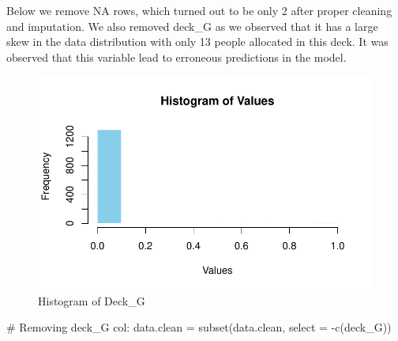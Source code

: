 \documentclass[
  letterpaper,
  DIV=11,
  numbers=noendperiod]{scrartcl}
\newenvironment{Shaded}{\begin{snugshade}}{\end{snugshade}}
\newcommand{\AttributeTok}[1]{\textcolor[rgb]{0.40,0.45,0.13}{#1}}
\newcommand{\CommentTok}[1]{\textcolor[rgb]{0.37,0.37,0.37}{#1}}
\newcommand{\FunctionTok}[1]{\textcolor[rgb]{0.28,0.35,0.67}{#1}}
\newcommand{\NormalTok}[1]{\textcolor[rgb]{0.00,0.23,0.31}{#1}}
\newcommand{\OtherTok}[1]{\textcolor[rgb]{0.00,0.23,0.31}{#1}}
\newcommand{\SpecialCharTok}[1]{\textcolor[rgb]{0.37,0.37,0.37}{#1}}
\newcommand{\StringTok}[1]{\textcolor[rgb]{0.13,0.47,0.30}{#1}}
\begin{document}
Below we remove NA rows, which turned out to be only 2 after proper
cleaning and imputation. We also removed deck\_G as we observed that it
has a large skew in the data distribution with only 13 people allocated
in this deck. It was observed that this variable lead to erroneous
predictions in the model.

\begin{Shaded}
\end{Shaded}

\begin{figure}[H]

{\centering \includegraphics{FinalProject_files/figure-pdf/unnamed-chunk-8-1.pdf}

}

\caption{Histogram of Deck\_G}

\end{figure}%

\begin{Shaded}
\begin{Highlighting}[]
\CommentTok{\# Removing deck\_G col:}
\NormalTok{data.clean }\OtherTok{=} \FunctionTok{subset}\NormalTok{(data.clean, }\AttributeTok{select  =} \SpecialCharTok{{-}}\FunctionTok{c}\NormalTok{(deck\_G))}
\end{Highlighting}
\end{Shaded}
\end{document}
